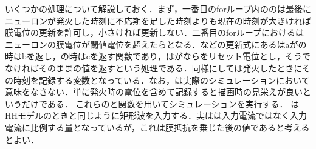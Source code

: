 いくつかの処理について解説しておく．まず，一番目のforループ内ののは最後にニューロンが発火した時刻に不応期を足した時刻よりも現在の時刻が大きければ膜電位の更新を許可し，小さければ更新しない．二番目のforループにおけるはニューロンの膜電位が閾値電位を超えたらとなる．などの更新式にあるはaがの時はbを返し，の時はcを返す関数であり，はがならをリセット電位とし，そうでなければそのままの値を返すという処理である．同様にしては発火したときにその時刻を記録する変数となっている．なお，は実際のシミュレーションにおいて意味をなさない．単に発火時の電位を含めて記録すると描画時の見栄えが良いというだけである．
これらのと関数を用いてシミュレーションを実行する． はHHモデルのときと同じように矩形波を入力する．実はは入力電流ではなく入力電流に比例する量となっているが，これは膜抵抗を乗じた後の値であると考えるとよい．
